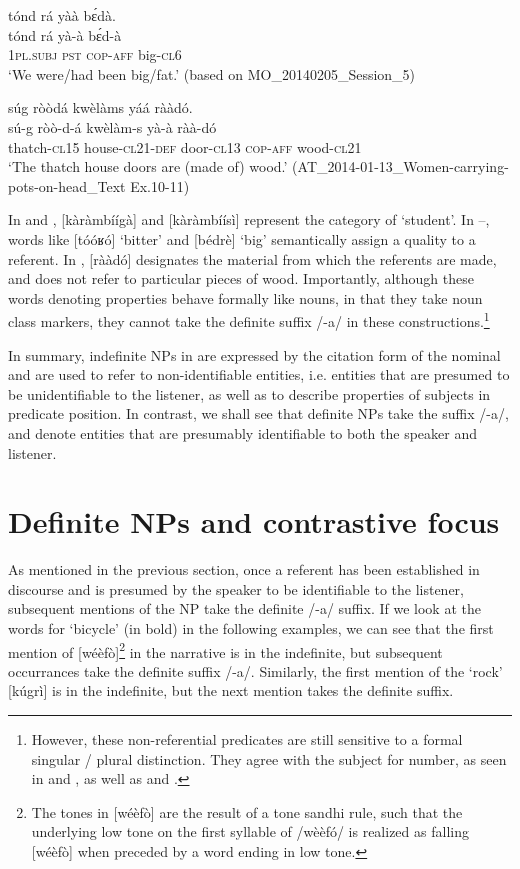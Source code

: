 \documentclass[output=paper]{langsci/langscibook}
\begin{document}
\ea\label{ex:teo:38}
\glll tónd rá yàà b\'ɛdà.\\
 tónd rá yà-à b\'ɛd-à\\
\textsc{1pl.subj} \textsc{pst} \textsc{cop-aff} big-\textsc{cl6}\\
\glt ‘We were/had been big/fat.’ (based on MO\_20140205\_Session\_5)
\z

\ea\label{ex:teo:39}
\glll súg ròòdá kwèlàms yáá rààdó.\\
 sú-g ròò-d-á kwèlàm-s yà-à ràà-dó\\
thatch-\textsc{cl15} house-\textsc{cl21}-\textsc{def} door-\textsc{cl13} \textsc{cop-aff} wood-\textsc{cl21}\\
\glt ‘The thatch house doors are (made of) wood.’ (AT\_2014-01-13\_Women-carrying-pots-on-head\_Text Ex.10-11)
\z

In  and  , [kàràmbíígà] and [kàràmbíísì] represent the category of ‘student’. In –, words like [tóóʁó] ‘bitter’ and [bédrè] ‘big’ semantically assign a quality to a referent. In , [rààdó] designates the material from which the referents are made, and does not refer to particular pieces of wood. Importantly, although these words denoting properties behave formally like nouns, in that they take noun class markers, they cannot take the definite suffix /-a/ in these constructions.\footnote{However, these non-referential predicates are still sensitive to a formal singular / plural distinction. They agree with the subject for number, as seen in  and , as well as  and .}

In summary, indefinite NPs in  are expressed by the citation form of the nominal and are used to refer to non-identifiable entities, i.e. entities that are presumed to be unidentifiable to the listener, as well as to describe properties of subjects in predicate position. In contrast, we shall see that definite NPs take the suffix /-a/, and denote entities that are presumably identifiable to both the speaker and listener.

\section{Definite NPs and contrastive focus}\label{sec:teo:6}

As mentioned in the previous section, once a referent has been established in discourse and is presumed by the speaker to be identifiable to the listener, subsequent mentions of the NP take the definite /-a/ suffix. If we look at the words for ‘bicycle’ (in bold) in the following examples, we can see that the first mention of [wéèfò]\footnote{The tones in [wéèfò] are the result of a tone sandhi rule, such that the underlying low tone on the first syllable of /wèèfó/ is realized as falling [wéèfò] when preceded by a word ending in low tone.} in the narrative is in the indefinite, but subsequent occurrances take the definite suffix /-a/. Similarly, the first mention of the ‘rock’ [kúgrì] is in the indefinite, but the next mention takes the definite suffix.
\end{document}

